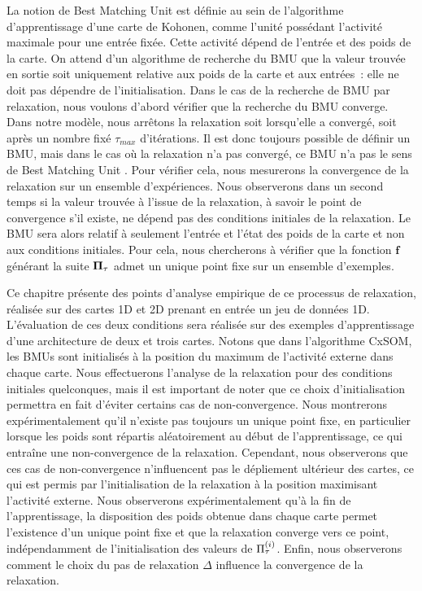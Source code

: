 \documentclass[../main]{subfiles}
\begin{document}
La notion de Best Matching Unit est définie au sein de l'algorithme d'apprentissage d'une carte de Kohonen, comme l'unité possédant l'activité maximale pour une entrée fixée. 
Cette activité dépend de l'entrée et des poids de la carte.
On attend d'un algorithme de recherche du BMU que la valeur trouvée en sortie soit uniquement relative aux poids de la carte et aux entrées~: elle ne doit pas dépendre de l'initialisation.
Dans le cas de la recherche de BMU par relaxation, nous voulons d'abord vérifier que la recherche du BMU converge. 
Dans notre modèle, nous arrêtons la relaxation soit lorsqu'elle a convergé, soit après un nombre fixé $\tau_{max}$ d'itérations. Il est donc toujours possible de définir un BMU, mais dans le cas où la relaxation n'a pas convergé, ce BMU n'a pas le sens de \og Best Matching Unit \fg{}. Pour vérifier cela, nous mesurerons la convergence de la relaxation sur un ensemble d'expériences.
Nous observerons dans un second temps si la valeur trouvée à l'issue de la relaxation, à savoir le point de convergence s'il existe, ne dépend pas des conditions initiales de la relaxation.
Le BMU sera alors relatif à seulement l'entrée et l'état des poids de la carte et non aux conditions initiales.
Pour cela, nous chercherons à vérifier que la fonction $\mathbf{f}$ générant la suite $\mathbf{\Pi}_\tau$ admet un unique point fixe sur un ensemble d'exemples. 

Ce chapitre présente des points d'analyse empirique de ce processus de relaxation, réalisée sur des cartes 1D et 2D prenant en entrée un jeu de données 1D.
L'évaluation de ces deux conditions sera réalisée sur des exemples d'apprentissage d'une architecture de deux et trois cartes. 
Notons que dans l'algorithme CxSOM, les BMUs sont initialisés à la position du maximum de l'activité externe dans chaque carte. 
Nous effectuerons l'analyse de la relaxation pour des conditions initiales quelconques, mais il est important de noter que ce choix d'initialisation permettra en fait d'éviter certains cas de non-convergence.
Nous montrerons expérimentalement qu'il n'existe pas toujours un unique point fixe, en particulier lorsque les poids sont répartis aléatoirement au début de l'apprentissage, ce qui entraîne une non-convergence de la relaxation. 
Cependant, nous observerons que ces cas de non-convergence n'influencent pas le dépliement ultérieur des cartes, ce qui est permis par l'initialisation de la relaxation à la position maximisant l'activité externe.
Nous observerons expérimentalement qu'à la fin de l'apprentissage, la disposition des poids obtenue dans chaque carte permet l'existence d'un unique point fixe et que la relaxation converge vers ce point, indépendamment de l'initialisation des valeurs de $\Pi^{({i})}_{\tau}$.
Enfin, nous observerons comment le choix du pas de relaxation $\Delta$ influence la convergence de la relaxation.
\end{document}
